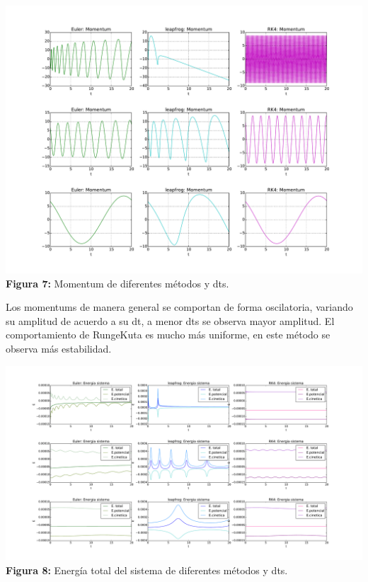 \documentclass[11pt,letterpaper]{exam}
\begin{document}
\begin{center}
\includegraphics[width=16.cm]{Mome_met_dt.pdf}
\textbf{Figura 7:}{  Momentum de diferentes m\'etodos y dts.}
\end{center}
{Los momentums de manera general se comportan de forma oscilatoria, variando su amplitud de acuerdo a su dt, a menor dts se observa mayor amplitud. El comportamiento de RungeKuta es mucho m\'as uniforme, en este m\'etodo se observa m\'as estabilidad.}

\begin{center}
\includegraphics[width=16.cm]{Ener_met_dt.pdf}
\textbf{Figura 8:}{  Energ\'ia total del sistema de diferentes m\'etodos y dts.}
\end{center}
\end{document}
